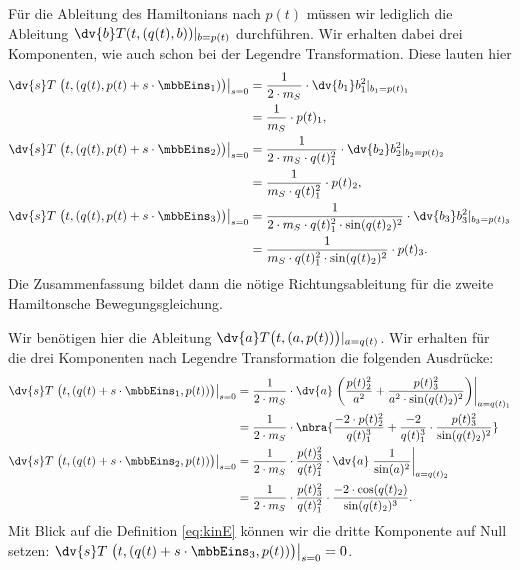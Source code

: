 \documentclass{subfiles}
\begin{document}
    Für die Ableitung des Hamiltonians nach $p(t)$ müssen wir lediglich die Ableitung $\dv{b}T(t,(q(t),b))|_{b = p(t)}$ durchführen. Wir erhalten dabei drei Komponenten, wie auch schon bei der Legendre Transformation. Diese lauten hier
    \begin{align*}
        \dv{s}T\left.\bigl(t,(q(t),p(t) + s\cdot\mbbEins_1)\bigr)\right|_{s=0} &= \frac{1}{2\cdot m_S}\cdot\dv{b_1}b_1^2|_{b_1 = p(t)_1} \\
        &= \frac{1}{m_S}\cdot p(t)_1, \\
        \dv{s}T\left.\bigl(t,(q(t),p(t) + s\cdot\mbbEins_2)\bigr)\right|_{s=0} &= \frac{1}{2\cdot m_S\cdot q(t)_1^2}\cdot\dv{b_2}b_2^2|_{b_2 = p(t)_2} \\
        &= \frac{1}{m_S\cdot q(t)_1^2}\cdot p(t)_2, \\
        \dv{s}T\left.\bigl(t,(q(t),p(t) + s\cdot\mbbEins_3)\bigr)\right|_{s=0} &= \frac{1}{2\cdot m_S\cdot q(t)_1^2\cdot\sin(q(t)_2)^2}\cdot\dv{b_3}b_3^2|_{b_3 = p(t)_3} \\
        &= \frac{1}{m_S\cdot q(t)_1^2\cdot\sin(q(t)_2)^2}\cdot p(t)_3.
    \end{align*}
    Die Zusammenfassung bildet dann die nötige Richtungsableitung für die zweite Hamiltonsche Bewegungsgleichung. 

    Wir benötigen hier die Ableitung $\dv{a}T\bigl(t,(a,p(t))\bigr)|_{a = q(t)}$. Wir erhalten für die drei Komponenten nach Legendre Transformation die folgenden Ausdrücke:
    \begin{align*}
        \dv{s}T\left.\bigl(t,(q(t) + s\cdot\mbbEins_1,p(t))\bigr)\right|_{s=0} &= \frac{1}{2\cdot m_S}\cdot\dv{a}\left.\biggl(\frac{p(t)_2^2}{a^2} + \frac{p(t)_3^2}{a^2\cdot\sin(q(t)_2)^2}\biggr)\right|_{a = q(t)_1} \\
        &= \frac{1}{2\cdot m_S}\cdot\nbra{
            \frac{-2\cdot p(t)_2^2}{q(t)_1^3} + \frac{-2}{q(t)_1^3}\cdot\frac{p(t)_3^2}{\sin(q(t)_2)^2}
        } \\
        \dv{s} T\left.\bigl(t,(q(t) + s\cdot\mbbEins_2,p(t))\bigr)\right|_{s=0} &= \frac{1}{2\cdot m_S}\cdot\frac{p(t)_3^2}{q(t)_1^2}\cdot\dv{a}\left.\frac{1}{\sin(a)^2}\right|_{a = q(t)_2} \\ 
        &= \frac{1}{2\cdot m_S}\cdot\frac{p(t)_3^2}{q(t)_1^2}\cdot\frac{-2\cdot\cos(q(t)_2)}{\sin(q(t)_2)^3}.
    \end{align*}
    Mit Blick auf die Definition \eqref{eq:kinE} können wir die dritte Komponente auf Null setzen: $\dv{s}T\left.\bigl(t,(q(t) + s\cdot\mbbEins_3,p(t))\bigr)\right|_{s=0} = 0$.
\end{document}

